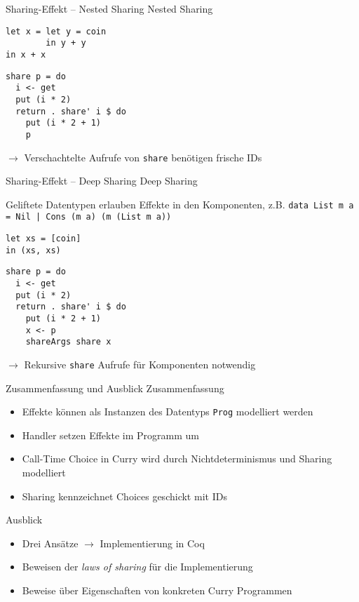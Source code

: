 \documentclass{beamer}
\newcommand{\haskellinline}[1]{\texttt{#1}}
\begin{document}
\begin{frame}[fragile]{Sharing-Effekt -- Nested Sharing}
\alert{Nested Sharing}

\begin{minipage}[t]{0.48\linewidth}
\begin{verbatim}
let x = let y = coin
        in y + y
in x + x
\end{verbatim}
\end{minipage}
\begin{minipage}[t]{0.48\linewidth}
\begin{verbatim}
share p = do
  i <- get
  put (i * 2)
  return . share' i $ do
    put (i * 2 + 1)
    p
\end{verbatim}
\end{minipage}
\vfill
$\rightarrow$ Verschachtelte Aufrufe von \haskellinline{share} benötigen frische IDs
\end{frame}

\begin{frame}[fragile]{Sharing-Effekt -- Deep Sharing}
\alert{Deep Sharing}

Geliftete Datentypen erlauben Effekte in den Komponenten, z.B.
  \haskellinline{data List m a = Nil | Cons (m a) (m (List m a))}

\vfill
\begin{minipage}[t]{0.48\linewidth}
\begin{verbatim}
let xs = [coin]
in (xs, xs)
\end{verbatim}
\end{minipage}
\begin{minipage}[t]{0.48\linewidth}
\begin{verbatim}
share p = do
  i <- get
  put (i * 2)
  return . share' i $ do
    put (i * 2 + 1)
    x <- p
    shareArgs share x
\end{verbatim}
\end{minipage}

$\rightarrow$ Rekursive \haskellinline{share} Aufrufe für Komponenten notwendig
\end{frame}

\begin{frame}[fragile]{Zusammenfassung und Ausblick}
Zusammenfassung
\begin{itemize}
\item Effekte können als Instanzen des Datentyps \haskellinline{Prog} modelliert werden
\item Handler setzen Effekte im Programm um
\item Call-Time Choice in Curry wird durch Nichtdeterminismus und Sharing modelliert
\item Sharing kennzeichnet Choices geschickt mit IDs
\end{itemize}
\vfill
Ausblick
\begin{itemize}
\item Drei Ansätze $\rightarrow$ Implementierung in Coq
\item Beweisen der \textit{laws of sharing} für die Implementierung
\item Beweise über Eigenschaften von konkreten Curry Programmen
\end{itemize}
\end{frame}
\end{document}
